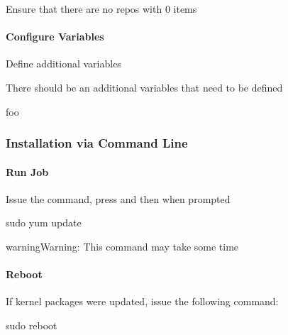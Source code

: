 \documentclass[letterpaper,10pt,english]{sphinxmanual}
\begin{document}
\sphinxAtStartPar
Ensure that there are no repos with 0 items


\paragraph{Configure Variables}
\label{\detokenize{legacy/legacy-install:configure-variables}}
\sphinxAtStartPar
Define additional variables

\sphinxAtStartPar
There should be an additional variables that need to be defined

\begin{sphinxVerbatim}[commandchars=\\\{\}]
 foo
\end{sphinxVerbatim}


\subsubsection{Installation via Command Line}
\label{\detokenize{legacy/legacy-install:installation-via-command-line}}

\paragraph{Run Job}
\label{\detokenize{legacy/legacy-install:run-job}}
\sphinxAtStartPar
Issue the command, press  and then \sphinxcode{\sphinxupquote{{[}ENTER{]}}} when prompted

\begin{sphinxVerbatim}[commandchars=\\\{\}]
sudo yum update
\end{sphinxVerbatim}

\begin{sphinxadmonition}{warning}{Warning:}
\sphinxAtStartPar
This command may take some time
\end{sphinxadmonition}


\paragraph{Reboot}
\label{\detokenize{legacy/legacy-install:reboot}}
\sphinxAtStartPar
If kernel packages were updated, issue the following command:

\begin{sphinxVerbatim}[commandchars=\\\{\}]
sudo reboot
\end{sphinxVerbatim}
\end{document}
